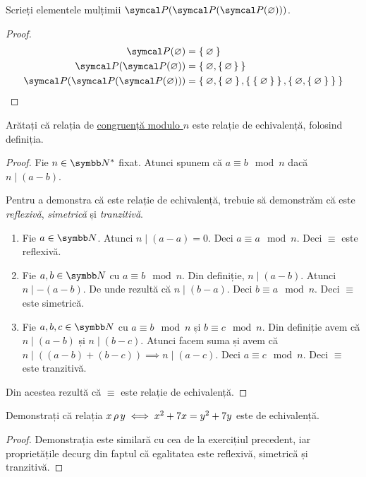\begin{exercise}
Scrieți elementele mulțimii \(\powerset(\powerset(\powerset(\varnothing)))\).
\end{exercise}

\begin{proof}
\begin{align*}
    \powerset(\varnothing) &= \Set{ \varnothing } \\
    \powerset(\powerset(\varnothing)) &= \Set{ \varnothing, \set{ \varnothing } } \\
    \powerset(\powerset(\powerset(\varnothing))) &= \Set{ \varnothing, \Set{ \varnothing }, \Set{\Set{\varnothing}}, \Set{ \varnothing, \Set{ \varnothing } } }
\end{align*}
\end{proof}

\begin{exercise}
Arătați că relația de \href{https://en.wikipedia.org/wiki/Modular_arithmetic#Definition_of_congruence_relation}{congruență modulo \(n\)} este relație de echivalență, folosind definiția.
\end{exercise}
\begin{proof}
Fie \(n \in \naturals^*\) fixat. Atunci spunem că \(a \equiv b \mod n\) dacă \(n \mid (a - b)\).

Pentru a demonstra că este relație de echivalență, trebuie să demonstrăm că este \emph{reflexivă}, \emph{simetrică} și \emph{tranzitivă}.

\begin{enumerate}
    \item Fie \(a \in \naturals\). Atunci \(n \mid (a - a) = 0\). Deci \(a \equiv a \mod n\). Deci \(\equiv\) este reflexivă.
    \item Fie \(a, b \in \naturals\) cu \(a \equiv b \mod n\). Din definiție, \(n \mid (a - b)\). Atunci \(n \mid - (a - b)\). De unde rezultă că \(n \mid (b - a)\). Deci \(b \equiv a \mod n\). Deci \(\equiv\) este simetrică.
    \item Fie \(a, b, c \in \naturals\) cu \(a \equiv b \mod n\) și \(b \equiv c \mod n\). Din definiție avem că \(n \mid (a - b)\) și \(n \mid (b - c)\). Atunci facem suma și avem că \(n \mid ((a - b) + (b - c)) \implies n \mid (a - c)\). Deci \(a \equiv c \mod n\). Deci \(\equiv\) este tranzitivă.
\end{enumerate}
Din acestea rezultă că \(\equiv\) este relație de echivalență.
\end{proof}

\begin{exercise}
Demonstrați că relația \(x \operatorname{\rho} y \iff x^2 + 7x = y^2 + 7y\) este de echivalență.
\end{exercise}
\begin{proof}
Demonstrația este similară cu cea de la exercițiul precedent, iar proprietățile decurg din faptul că egalitatea este reflexivă, simetrică și tranzitivă. 
\end{proof}

